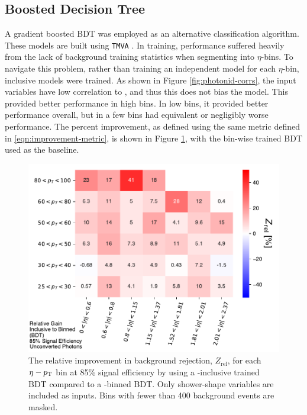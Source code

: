 \subsection{Boosted Decision Tree}\label{ssec:yid-bdt}

A gradient boosted \gls{BDT} was employed as an alternative classification algorithm. These models are built using \texttt{TMVA} \cite{TMVA}. In training, performance suffered heavily from the lack of background training statistics when segmenting into $\eta$-\pt bins. To navigate this problem, rather than training an independent model for each $\eta$-\pt bin, \pt inclusive models were trained. As shown in Figure \ref{fig:photonid-corrs}, the input variables have low correlation to \pt, and thus this does not bias the model. This provided better performance in high \pt bins. In low \pt bins, it provided better performance overall, but in a few bins had equivalent or negligibly worse performance. The percent improvement, as defined using the same metric defined in \ref{eqn:improvement-metric}, is shown in Figure \ref{fig:bdtinclusive-vs-bdt}, with the bin-wise trained \gls{BDT} used as the baseline.

\begin{figure}[!th]
    \centering
    \includegraphics[width=.85\textwidth]{chapters/chapter4_photonID/images/BDTInclusive_v_BDT_normed.pdf}
    \caption[The relative improvement in background rejection by using a \pt-inclusive trained \gls{BDT} compared to a \pt-binned \gls{BDT}]
    {The relative improvement in background rejection, $Z_{\text{rel}}$, for each $\eta-p_{\text{T}}$ bin at 85\% signal efficiency by using a \pt-inclusive trained \gls{BDT} compared to a \pt-binned \gls{BDT}. Only shower-shape variables are included as inputs. Bins with fewer than 400 background events are masked.}
    \label{fig:bdtinclusive-vs-bdt}
\end{figure}


